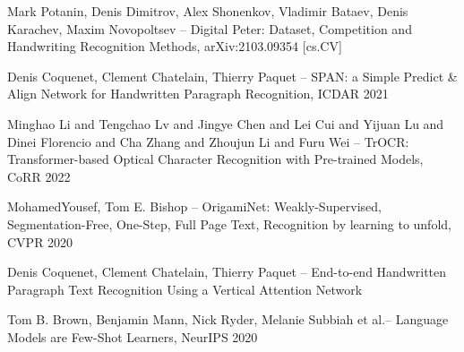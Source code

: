 \documentclass{extarticle}
\begin{document}
	
\begin{thebibliography}{00}
	Mark Potanin, Denis Dimitrov, Alex Shonenkov, Vladimir Bataev, Denis Karachev, Maxim Novopoltsev -- Digital Peter: Dataset, Competition and Handwriting Recognition Methods, arXiv:2103.09354 [cs.CV]
	
	Denis Coquenet, Clement Chatelain, Thierry Paquet -- SPAN: a Simple Predict \& Align
	Network for Handwritten Paragraph Recognition, ICDAR 2021
	
	Minghao Li and Tengchao Lv and Jingye Chen and Lei Cui and Yijuan Lu and Dinei Florencio and Cha Zhang and Zhoujun Li and Furu Wei -- TrOCR: Transformer-based
	Optical Character Recognition with Pre-trained Models, CoRR 2022
	
	MohamedYousef, Tom E. Bishop -- OrigamiNet: Weakly-Supervised, Segmentation-Free,
	One-Step, Full Page Text, Recognition by learning to unfold, CVPR 2020
	
	Denis Coquenet, Clement Chatelain, Thierry Paquet -- End-to-end Handwritten
	Paragraph Text Recognition Using a Vertical Attention Network
	
	Tom B. Brown, Benjamin Mann, Nick Ryder, Melanie Subbiah et al.-- Language Models
	are Few-Shot Learners, NeurIPS 2020
\end{thebibliography}
	
	
\end{document}
